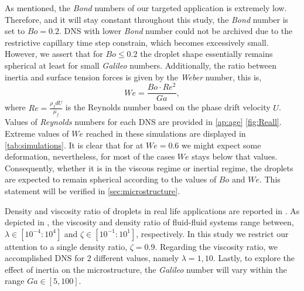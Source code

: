 As mentioned, the \textit{Bond} numbers of our targeted application is extremely low.
Therefore, and it will stay constant throughout this study, the \textit{Bond} number is set to $Bo = 0.2$.
DNS with lower \textit{Bond} number could not be archived due to the restrictive capillary time step constrain, which becomes excessively small. 
However, we assert that for $Bo \leq 0.2$ the droplet shape essentially remains spherical at least for small \textit{Galileo} numbers. 
Additionally, the ratio between inertia and surface tension forces is given by the \textit{Weber} number, this is,
\begin{equation*}
    We = \frac{Bo \cdot Re^2}{Ga},
\end{equation*}
where $Re = \frac{\rho_f d U}{\mu_f}$ is the Reynolds number based on the phase drift velocity $U$.
Values of \textit{Reynolds} numbers for each DNS are provided in \ref{ap:age} \ref{fig:Reall}. 
Extreme values of $We$ reached in these simulations are displayed in \ref{tab:simulations}. 
It is clear that for at $We=0.6$ we might expect some deformation, nevertheless, for most of the cases $We$ stays below that values. 
Consequently, whether it is in the viscous regime or inertial regime, the droplets are expected to remain spherical according to the values of $Bo$ and $We$.
This statement will be verified in \ref{sec:microstructure}. 

Density and viscosity ratio of droplets in real life applications are reported in \citet[Figure 1.]{balla2020effect}.
As depicted in \citet[Figure 1.]{balla2020effect}, the viscosity and density ratio of fluid-fluid systems range between, $\lambda \in [10^{-4} : 10^4]$ and $\zeta \in [10^{-1} : 10^1]$, respectively. 
In this study we restrict our attention to a single density ratio, $\zeta = 0.9$.
Regarding the viscosity ratio, we accomplished DNS for 2 different values, namely $\lambda = 1,10$.
Lastly, to explore the effect of inertia on the microstructure, the \textit{Galileo} number will vary within the range $Ga \in [5,100]$.

